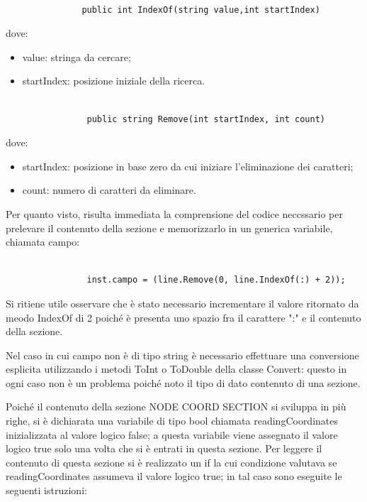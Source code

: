 \documentclass[11pt]{article}
\begin{document}
\begin{lstlisting}

               public int IndexOf(string value,int startIndex)

\end{lstlisting}

dove:

\begin{itemize}
	\item value: stringa da cercare;
	\item startIndex: posizione iniziale della ricerca.
\end{itemize}

\begin{lstlisting}

                public string Remove(int startIndex, int count)

\end{lstlisting}


dove:

\begin{itemize}
	\item startIndex: posizione in base zero da cui iniziare l'eliminazione dei caratteri;
	\item count: numero di caratteri da eliminare.
\end{itemize}

Per quanto visto, risulta immediata la comprensione del codice neccssario per prelevare il contenuto della sezione e memorizzarlo in un generica variabile, chiamata campo:

\begin{lstlisting}

                inst.campo = (line.Remove(0, line.IndexOf(:) + 2));

\end{lstlisting}

Si ritiene utile osservare che \`e stato necessario incrementare il valore ritornato da meodo IndexOf di 2 poich\'e \`e presenta uno spazio fra il carattere ":" e il contenuto della sezione.

Nel caso in cui campo non \`e di tipo string \`e necessario effettuare una conversione esplicita utilizzando i metodi ToInt o ToDouble della classe Convert: questo in ogni caso non \`e un problema poich\'e noto il tipo di dato contenuto di una sezione.

Poich\'e  il contenuto della sezione NODE COORD SECTION si sviluppa in pi\`u righe, si \`e dichiarata una variabile di tipo bool chiamata readingCoordinates inizializzata al valore logico false; a questa variabile viene assegnato il valore logico true solo una volta che si \`e entrati in questa sezione. 
Per leggere il contenuto di questa sezione si \`e realizzato un if la cui condizione valutava se readingCoordinates assumeva il valore logico true; in tal caso sono eseguite le seguenti istruzioni:
\end{document}
